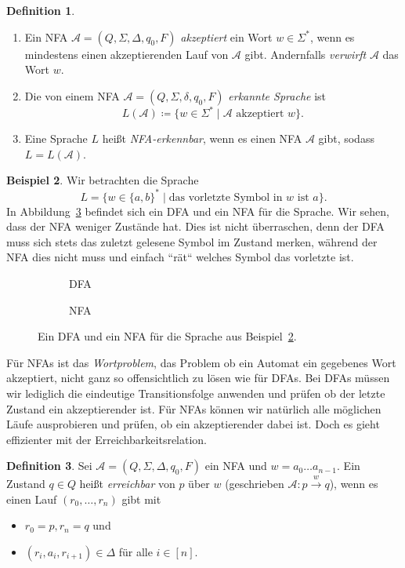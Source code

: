 \documentclass[11pt, a4paper]{article}
\theoremstyle{definition}
\newtheorem{definition}{Definition}[section]
\newtheorem{example}[definition]{Beispiel}
\theoremstyle{plain}
\numberwithin{equation}{section}
\newcommand{\reaches}{\xrightarrow}
\begin{document}
\begin{definition}
\
	\begin{enumerate}
		\item Ein NFA $\mathcal{A} = (Q, \Sigma, \Delta, q_0, F)$ \textit{akzeptiert} ein Wort $w \in \Sigma^\ast$, wenn es mindestens einen akzeptierenden Lauf von $\mathcal{A}$ gibt. Andernfalls \textit{verwirft} $\mathcal{A}$ das Wort $w$.
		\item Die von einem NFA $\mathcal{A} = (Q, \Sigma, \delta, q_0, F)$ \textit{erkannte Sprache} ist
			$$
				L(\mathcal{A}) \coloneqq \{ w \in \Sigma^\ast \mid \mathcal{A} \text{ akzeptiert } w \}.
			$$
		\item Eine Sprache $L$ heißt \textit{NFA-erkennbar}, wenn es einen NFA $\mathcal{A}$ gibt, sodass $L = L(\mathcal{A})$.
	\end{enumerate}
\end{definition}
\begin{example}\label{exp:compare_dfa_nfa}
	Wir betrachten die Sprache
	$$
		L = \{ w \in \{a, b\}^\ast \mid \text{das vorletzte Symbol in } w \text{ ist } a \}.
	$$
	In Abbildung~\ref{fig:nfa_ex1} befindet sich ein DFA und ein NFA für die Sprache. Wir sehen, dass der NFA weniger Zustände hat. Dies ist nicht überraschen, denn der DFA muss sich stets das zuletzt gelesene Symbol im Zustand merken, während der NFA dies nicht muss und einfach ``rät`` welches Symbol das vorletzte ist.
\end{example}
\begin{figure}
	\centering
	\begin{subfigure}[b]{.49\textwidth}
		\centering
		
		\caption{DFA}
		\label{fig:nfa_ex1dfa}
	\end{subfigure}
	\begin{subfigure}[b]{.49\textwidth}
		\centering
		
		\caption{NFA}
		\label{fig:nfa_ex1nfa}
	\end{subfigure}
	\caption{Ein DFA und ein NFA für die Sprache aus Beispiel~\ref{exp:compare_dfa_nfa}.}
	\label{fig:nfa_ex1}
\end{figure}
Für NFAs ist das \textit{Wortproblem}, das Problem ob ein Automat ein gegebenes Wort akzeptiert, nicht ganz so offensichtlich zu lösen wie für DFAs. Bei DFAs müssen wir lediglich die eindeutige Transitionsfolge anwenden und prüfen ob der letzte Zustand ein akzeptierender ist. Für NFAs können wir natürlich alle möglichen Läufe ausprobieren und prüfen, ob ein akzeptierender dabei ist. Doch es gieht effizienter mit der Erreichbarkeitsrelation.
\begin{definition}\label{def:reachability}
	Sei $\mathcal{A} = (Q, \Sigma, \Delta, q_0, F)$ ein NFA und $w = a_0 \ldots a_{n-1}$. Ein Zustand $q \in Q$ heißt \textit{erreichbar} von $p$ über $w$ (geschrieben $\mathcal{A}: p \reaches{w} q$), wenn es einen Lauf $(r_0, \ldots, r_n)$ gibt mit 
	\begin{itemize}
		\item $r_0 = p, r_n = q$ und
		\item $(r_i, a_i, r_{i+1}) \in \Delta$ für alle $i \in [n]$.
	\end{itemize}
\end{definition}
\end{document}
